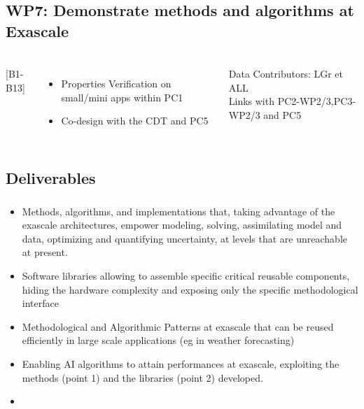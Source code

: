 \subsection{WP7: Demonstrate methods and algorithms at Exascale}
\begin{frame}
  \frametitle{\insertsectionhead}
  \framesubtitle{\insertsubsectionhead}

  \begin{columns}
    [B1-B13]
    \begin{itemize}
      \item Properties Verification on small/mini apps within PC1
      \item Co-design with the CDT and PC5
    \end{itemize}
    \begin{alertblock}{Data }
      Contributors: LGr et ALL\\
      Links with PC2-WP2/3,PC3-WP2/3 and PC5
    \end{alertblock}
   
  \end{columns}
\end{frame}

\subsection{Deliverables}

\begin{frame}
  \frametitle{\insertsectionhead}
  \framesubtitle{\insertsubsectionhead}
  \begin{itemize}
      \item   Methods, algorithms, and implementations that, taking advantage of the exascale architectures, empower modeling, solving, assimilating model and data, optimizing and quantifying uncertainty, at levels that are unreachable at present.
    \item Software libraries allowing to assemble specific critical reusable components, hiding the hardware complexity and exposing only the specific methodological interface
    \item Methodological and Algorithmic Patterns at exascale that can be reused efficiently in large scale applications (eg in weather forecasting)
    \item Enabling AI algorithms to attain performances at exascale, exploiting the methods (point 1) and the libraries (point 2) developed.
    \item \href{https://docs.google.com/document/d/1hjwSFRF63SyTUJJKGMNLHcJPr_S2JDHYXeBeQzHCSno/edit?usp=sharing}{}

  \end{itemize}


\end{frame}

